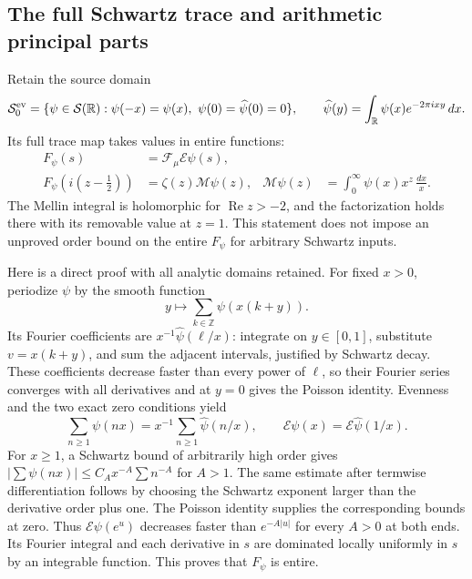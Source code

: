 \subsection{The full Schwartz trace and arithmetic principal parts}
\label{sec:cq-principalparts}
Retain the source domain
\[
 \mathcal S_0^{\rm ev}
 =\{\psi\in\mathcal S(\mathbb R):
       \psi(-x)=\psi(x),\ \psi(0)=\widehat\psi(0)=0\},
 \qquad
 \widehat\psi(y)=\int_{\mathbb R}\psi(x)e^{-2\pi ixy}\,dx.
\]
Its full trace map takes values in entire functions:
\begin{equation}\label{eq:cq-Schwartz-trace}
 \begin{aligned}
 F_\psi(s)&=\mathcal F_\mu\mathcal E\psi(s),\\
 F_\psi(i(z-\tfrac12))&=\zeta(z)\mathcal M\psi(z),
 &\mathcal M\psi(z)&=\int_0^\infty\psi(x)x^z\,\frac{dx}{x}.
 \end{aligned}
\end{equation}
The Mellin integral is holomorphic for $\operatorname{Re}z>-2$,
and the factorization holds there with its removable value at
$z=1$. This statement does not impose an unproved order bound
on the entire $F_\psi$ for arbitrary Schwartz inputs.

Here is a direct proof with all analytic domains retained.
For fixed $x>0$, periodize $\psi$ by the smooth function
\[
 y\longmapsto\sum_{k\in\mathbb Z}\psi(x(k+y)).
\]
Its Fourier coefficients are $x^{-1}\widehat\psi(\ell/x)$:
integrate on $y\in[0,1]$, substitute $v=x(k+y)$, and sum the
adjacent intervals, justified by Schwartz decay. These coefficients
decrease faster than every power of $\ell$, so their Fourier series
converges with all derivatives and at $y=0$ gives the Poisson
identity. Evenness and the two exact zero conditions yield
\[
 \sum_{n\geq1}\psi(nx)=x^{-1}\sum_{n\geq1}\widehat\psi(n/x),
 \qquad \mathcal E\psi(x)=\mathcal E\widehat\psi(1/x).
\]
For $x\geq1$, a Schwartz bound of arbitrarily high order gives
$|\sum\psi(nx)|\leq C_Ax^{-A}\sum n^{-A}$ for $A>1$.
The same estimate after termwise differentiation follows by choosing
the Schwartz exponent larger than the derivative order plus one.
The Poisson identity supplies the corresponding bounds at zero.
Thus $\mathcal E\psi(e^u)$ decreases faster than $e^{-A|u|}$
for every $A>0$ at both ends. Its Fourier integral and each
derivative in $s$ are dominated locally uniformly in $s$ by an
integrable function. This proves that $F_\psi$ is entire.

